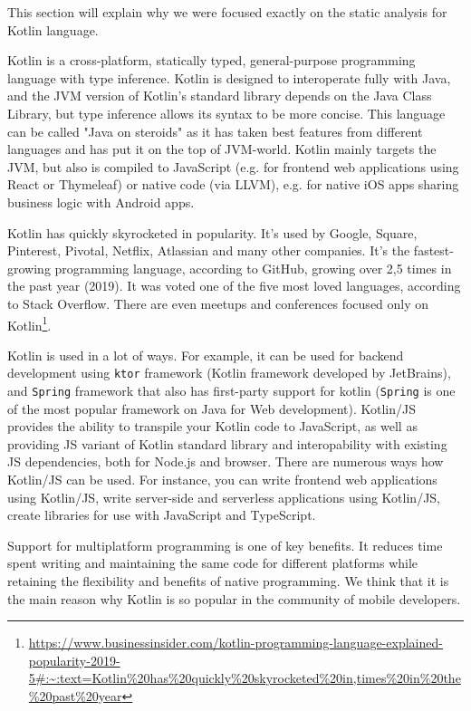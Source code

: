 This section will explain why we were focused exactly on the static analysis for Kotlin language. 

Kotlin is a cross-platform, statically typed, general-purpose programming language with type inference. Kotlin is designed to interoperate fully with Java, and the JVM version of Kotlin's standard library depends on the Java Class Library, but type inference allows its syntax to be more concise. This language can be called "Java on steroids" as it has taken best features from different languages and has put it on the top of JVM-world. Kotlin mainly targets the JVM, but also is compiled to JavaScript (e.g. for frontend web applications using React or Thymeleaf) or native code (via LLVM), e.g. for native iOS apps sharing business logic with Android apps. %

Kotlin has quickly skyrocketed in popularity. It's used by Google, Square, Pinterest, Pivotal, Netflix, Atlassian and many other companies. It's the fastest-growing programming language, according to GitHub, growing over 2,5 times in the past year (2019). It was voted one of the five most loved languages, according to Stack Overflow. There are even meetups and conferences focused only on Kotlin\footnote{\url{https://www.businessinsider.com/kotlin-programming-language-explained-popularity-2019-5\#:\~:text=Kotlin\%20has\%20quickly\%20skyrocketed\%20in,times\%20in\%20the\%20past\%20year}}.

Kotlin is used in a lot of ways. For example, it can be used for backend development using \texttt{ktor} framework (Kotlin framework developed by JetBrains), and  \texttt{Spring} framework that also has first-party support for kotlin (\texttt{Spring} is one of the most popular framework on Java for Web development). Kotlin/JS provides the ability to transpile your Kotlin code to JavaScript, as well as providing JS variant of Kotlin standard library and interopability with existing JS dependencies, both for Node.js and browser. There are numerous ways how Kotlin/JS can be used. For instance, you can write frontend web applications using Kotlin/JS,
write server-side and serverless applications using Kotlin/JS, create libraries for use with JavaScript and TypeScript.

Support for multiplatform programming is one of key benefits. It reduces time spent writing and maintaining the same code for different platforms while retaining the flexibility and benefits of native programming. We think that it is the main reason why Kotlin is so popular in the community of mobile developers.

